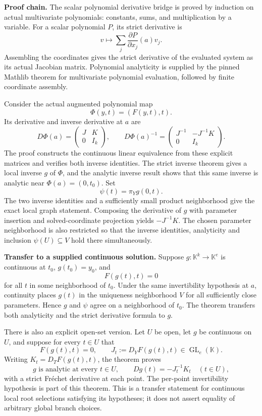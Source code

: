 \textbf{Proof chain.} The scalar polynomial derivative bridge is proved
by induction on actual multivariate polynomials: constants, sums, and
multiplication by a variable. For a scalar polynomial \(P\), its strict
derivative is \[
v\longmapsto\sum_j \frac{\partial P}{\partial x_j}(a)v_j.
\] Assembling the coordinates gives the strict derivative of the
evaluated system as its actual Jacobian matrix. Polynomial analyticity
is supplied by the pinned Mathlib theorem for multivariate polynomial
evaluation, followed by finite coordinate assembly.

Consider the actual augmented polynomial map \[
\Phi(y,t)=(F(y,t),t).
\] Its derivative and inverse derivative at \(a\) are \[
D\Phi(a)=
\begin{pmatrix}J&K\\0&I_k\end{pmatrix},
\qquad
D\Phi(a)^{-1}=
\begin{pmatrix}J^{-1}&-J^{-1}K\\0&I_k\end{pmatrix}.
\] The proof constructs the continuous linear equivalence from these
explicit matrices and verifies both inverse identities. The strict
inverse theorem gives a local inverse \(g\) of \(\Phi\), and the
analytic inverse result shows that this same inverse is analytic near
\(\Phi(a)=(0,t_0)\). Set \[
\psi(t)=\pi_Y g(0,t).
\] The two inverse identities and a sufficiently small product
neighborhood give the exact local graph statement. Composing the
derivative of \(g\) with parameter insertion and solved-coordinate
projection yields \(-J^{-1}K\). The chosen parameter neighborhood is
also restricted so that the inverse identities, analyticity and
inclusion \(\psi(U)\subseteq V\) hold there simultaneously.

\textbf{Transfer to a supplied continuous solution.} Suppose
\(g:\mathbb K^k\to\mathbb K^e\) is continuous at \(t_0\),
\(g(t_0)=y_0\), and \[
F(g(t),t)=0
\] for all \(t\) in some neighborhood of \(t_0\). Under the same
invertibility hypothesis at \(a\), continuity places \(g(t)\) in the
uniqueness neighborhood \(V\) for all sufficiently close parameters.
Hence \(g\) and \(\psi\) agree on a neighborhood of \(t_0\). The theorem
 transfers both analyticity
and the strict derivative formula to \(g\).

There is also an explicit open-set version. Let \(U\) be open, let \(g\)
be continuous on \(U\), and suppose for every \(t\in U\) that \[
F(g(t),t)=0,
\qquad
J_t:=D_YF(g(t),t)\in\operatorname{GL}_e(\mathbb K).
\] Writing \(K_t=D_TF(g(t),t)\), the theorem
 proves \[
g\text{ is analytic at every }t\in U,
\qquad Dg(t)=-J_t^{-1}K_t\quad(t\in U),
\] with a strict Fréchet derivative at each point. The per-point
invertibility hypothesis is part of this theorem. This is a transfer
statement for continuous local root selections satisfying its
hypotheses; it does not assert equality of arbitrary global branch
choices.

